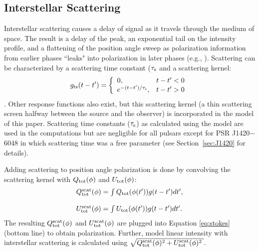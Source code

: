 \subsection{Interstellar Scattering}
Interstellar scattering causes a delay of signal as it travels through
the medium of space.  The result is a delay of the peak, an exponential
tail on the intensity profile, and a flattening of the position angle sweep as polarization information from
earlier phases ``leaks" into polarization in later phases (e.g., \citealp{li2003effect}).
Scattering can be characterized by a scattering time constant ($\tau_{\rm s}$ and
a scattering kernel:
\begin{equation}\label{eq:gts}
g_{\rm ts}(t-t')=\left\{
\begin{array}{lr}
0,                       & t-t' < 0 \\
e^{-(t-t') / \tau_{\rm s}},  & t-t' > 0
\end{array}
\right.
\end{equation}
\citep{cronyn1970analysis}.
Other response functions also exist, but this scattering kernel
(a thin scattering screen halfway between the source and 
the observer) is incorporated in the model of this paper.
Scattering time constants ($\tau_{\rm s}$) as calculated using the \cite{cordes2002ne2001} model are
used in the computations but are negligible for all pulsars
except for PSR J1420$-$6048 in which scattering time was
a free parameter (see Section~\ref{sec:J1420} for details).

Adding scattering to position angle polarization is done
by convolving the scattering kernel with $Q_{\rm{tot}}(\phi)$ and 
$U_{\rm{tot}}(\phi)$:
\begin{equation}\label{eq:con}
\begin{array}{l}
Q_{\rm{tot}}^{\rm{scat}}(\phi)=\int Q_{\rm{tot}}(\phi(t')) g(t-t') dt',
\\ \\
U_{\rm{tot}}^{\rm{scat}}(\phi)=\int U_{\rm{tot}}(\phi(t')) g(t-t') dt'.
\end{array}
\end{equation}
The resulting $Q_{\rm{tot}}^{\rm{scat}}(\phi)$ 
and $U_{\rm{tot}}^{\rm{scat}}(\phi)$ are plugged
into Equation \ref{eq:stokes} (bottom line) to obtain polarization.  Further, 
model linear intensity with interstellar scattering is calculated using 
$\sqrt{Q_{\rm{tot}}^{\rm{scat}}(\phi)^2+U_{\rm{tot}}^{\rm{scat}}(\phi)^2}$.

